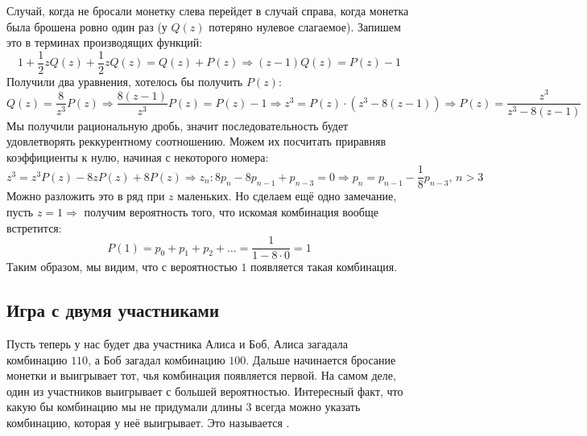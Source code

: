 \documentclass[12pt]{article}
\theoremstyle{definition}
\begin{document}
Случай, когда не бросали монетку слева перейдет в случай справа, когда монетка была брошена ровно один раз (у $Q(z)$ потеряно нулевое слагаемое). Запишем это в терминах производящих функций:
$$
	1 + \dfrac{1}{2}zQ(z) + \dfrac{1}{2}zQ(z) = Q(z) + P(z) \Rightarrow (z-1)Q(z) = P(z) - 1
$$
Получили два уравнения, хотелось бы получить $P(z)$:
$$
	Q(z) = \dfrac{8}{z^3}P(z) \Rightarrow \dfrac{8(z-1)}{z^3}P(z) = P(z) - 1\Rightarrow z^3 = P(z){\cdot}(z^3 - 8(z-1)) \Rightarrow P(z) = \dfrac{z^3}{z^3 - 8(z-1)}
$$
Мы получили рациональную дробь, значит последовательность будет удовлетворять реккурентному соотношению. Можем их посчитать приравняв коэффициенты к нулю, начиная с некоторого номера: 
$$
	z^3 = z^3 P(z) - 8z P(z) + 8 P(z) \Rightarrow z_n \colon 8p_n - 8 p_{n-1} + p_{n-3} = 0 \Rightarrow p_n = p_{n-1} - \dfrac{1}{8}p_{n-3}, \, n > 3
$$
Можно разложить это в ряд при $z$ маленьких. Но сделаем ещё одно замечание, пусть $z = 1 \Rightarrow$ получим вероятность того, что искомая комбинация вообще встретится:
$$
	P(1) = p_0 + p_1 + p_2 + \dotsc = \dfrac{1}{1 -8{\cdot}0} = 1
$$
Таким образом, мы видим, что с вероятностью $1$ появляется такая комбинация.

\subsection*{Игра с двумя участниками} 
Пусть теперь у нас будет два участника Алиса и Боб, Алиса загадала комбинацию $110$, а Боб загадал комбинацию $100$. Дальше начинается бросание монетки и выигрывает тот, чья комбинация появляется первой. На самом деле, один из участников выигрывает с большей вероятностью. Интересный факт, что какую бы комбинацию мы не придумали длины $3$ всегда можно указать комбинацию, которая у неё выигрывает. Это называется .
\end{document}

